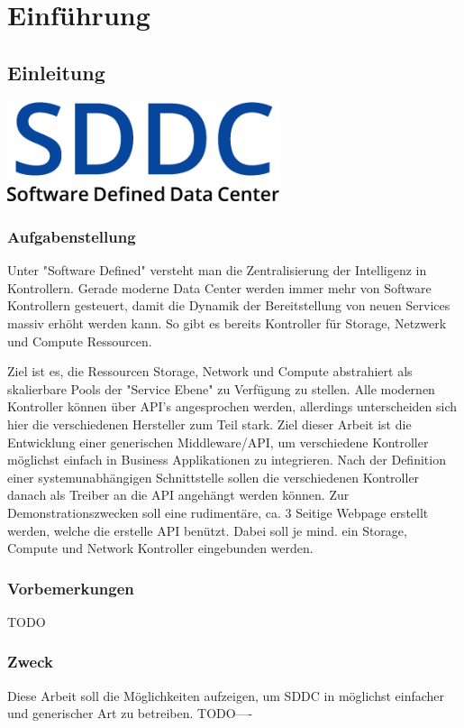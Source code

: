\part{Einführung}
\chapter{Einleitung}
\begin{center}
  \includegraphics[width=0.6\textwidth]{./22_Grafiken/01_Logo/SDDC}
\end{center}

\section{Aufgabenstellung}

Unter "Software Defined" versteht man die Zentralisierung der Intelligenz in Kontrollern. 
Gerade moderne Data Center werden immer mehr von Software Kontrollern gesteuert, 
damit die Dynamik der Bereitstellung von neuen Services massiv erhöht werden kann. 
So gibt es bereits Kontroller für Storage, Netzwerk und Compute Ressourcen.

Ziel ist es, die Ressourcen Storage, Network und Compute abstrahiert als skalierbare 
Pools der "Service Ebene" zu Verfügung zu stellen. Alle modernen Kontroller können
 über API's angesprochen werden, allerdings unterscheiden sich hier die verschiedenen 
 Hersteller zum Teil stark.
Ziel dieser Arbeit ist die Entwicklung einer generischen Middleware/API, um verschiedene
 Kontroller möglichst einfach in Business Applikationen zu integrieren. Nach der Definition 
 einer systemunabhängigen Schnittstelle sollen die verschiedenen Kontroller danach als 
 Treiber an die API angehängt werden können. Zur Demonstrationszwecken soll eine rudimentäre, 
 ca. 3 Seitige Webpage erstellt werden, welche die erstelle 
API benützt. Dabei soll je mind. ein Storage, Compute und Network Kontroller eingebunden werden.

\section{Vorbemerkungen}
TODO
\section{Zweck}
Diese Arbeit soll die Möglichkeiten aufzeigen, um \ac{SDDC} in möglichst einfacher 
und generischer Art zu betreiben.
TODO----
